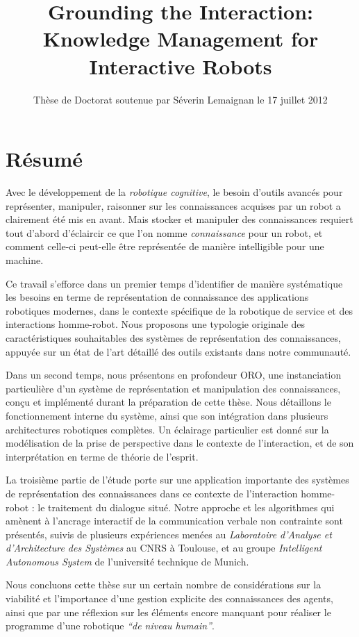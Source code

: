 \documentclass[a4paper]{article}
\title{Grounding the Interaction: Knowledge Management for Interactive Robots}
\author{Thèse de Doctorat soutenue par Séverin Lemaignan le 17 juillet 2012}
\date{}
\begin{document}
\maketitle

\section{Résumé}


Avec le développement de la \emph{robotique cognitive}, le besoin d'outils
avancés pour représenter, manipuler, raisonner sur les connaissances acquises
par un robot a clairement été mis en avant. Mais stocker et manipuler des
connaissances requiert tout d'abord d'éclaircir ce que l'on nomme
\emph{connaissance} pour un robot, et comment celle-ci peut-elle être
représentée de manière intelligible pour une machine.

Ce travail s'efforce dans un premier temps d'identifier de manière systématique
les besoins en terme de représentation de connaissance des applications
robotiques modernes, dans le contexte spécifique de la robotique de service et
des interactions homme-robot. Nous proposons une typologie originale des
caractéristiques souhaitables des systèmes de représentation des connaissances,
appuyée sur un état de l'art détaillé des outils existants dans notre
communauté.

Dans un second temps, nous présentons en profondeur ORO, une instanciation
particulière d'un système de représentation et manipulation des connaissances,
conçu et implémenté durant la préparation de cette thèse. Nous détaillons le
fonctionnement interne du système, ainsi que son intégration dans plusieurs
architectures robotiques complètes. Un éclairage particulier est donné sur la
modélisation de la prise de perspective dans le contexte de l'interaction, et de
son interprétation en terme de théorie de l'esprit.

La troisième partie de l'étude porte sur une application importante des
systèmes de représentation des connaissances dans ce contexte de l'interaction
homme-robot : le traitement du dialogue situé. Notre approche et les
algorithmes qui amènent à l'ancrage interactif de la communication verbale non
contrainte sont présentés, suivis de plusieurs expériences menées au
\emph{Laboratoire d'Analyse et d'Architecture des Systèmes} au CNRS à Toulouse,
et au groupe \emph{Intelligent Autonomous System} de l'université technique de
Munich.

Nous concluons cette thèse sur un certain nombre de considérations sur la
viabilité et l'importance d'une gestion explicite des connaissances des agents,
ainsi que par une réflexion sur les éléments encore manquant pour réaliser le
programme d'une robotique \emph{``de niveau humain''}.
\end{document}
